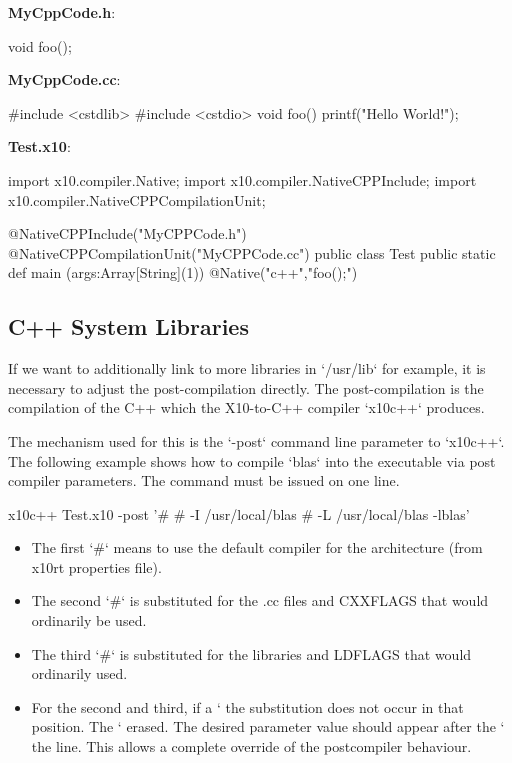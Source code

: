 {\bf MyCppCode.h}: 
\begin{xten}
void foo();
\end{xten}


{\bf MyCppCode.cc}:
\begin{xten}
#include <cstdlib>
#include <cstdio>
void foo() {
    printf("Hello World!\n");
}
\end{xten}

{\bf Test.x10}:
\begin{xten}
import x10.compiler.Native;
import x10.compiler.NativeCPPInclude;
import x10.compiler.NativeCPPCompilationUnit;

@NativeCPPInclude("MyCPPCode.h")
@NativeCPPCompilationUnit("MyCPPCode.cc")
public class Test {
    public static def main (args:Array[String](1)) {
        { @Native("c++","foo();") {} }
    }
}
\end{xten}

\subsection{C++ System Libraries}

If we want to additionally link to more libraries in \xcd`/usr/lib` for
example, it is necessary to adjust the post-compilation directly.  The
post-compilation is the compilation of the C++ which the X10-to-C++ compiler
\xcd`x10c++` produces.  

The mechanism used for this is the \xcd`-post` command line parameter to
\xcd`x10c++`. The following example shows how to compile \xcd`blas` into the
executable via post compiler parameters. The command must be issued on one line.

\begin{xten}
x10c++ Test.x10 -post '# # -I /usr/local/blas # 
  -L /usr/local/blas -lblas'
\end{xten}

\begin{itemize}
\item The first \xcd`#` means to use the default compiler for the architecture (from
      x10rt properties file). 
\item The second \xcd`#` is substituted for the .cc files and CXXFLAGS that would
      ordinarily be used. 
\item The third \xcd`#` is substituted for the libraries and LDFLAGS that would
      ordinarily used.
\item For the second and third, if a \xcd`%
      the substitution does not occur in that position.  The \xcd`%
      erased.  The desired parameter value should appear after the \xcd`%
      the line. This allows a complete override of the postcompiler behaviour.
\end{itemize}
